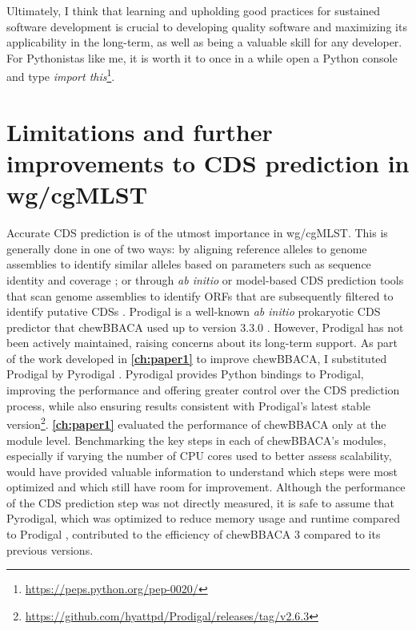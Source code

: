 Ultimately, I think that learning and upholding good practices for sustained software development is crucial to developing quality software and maximizing its applicability in the long-term, as well as being a valuable skill for any developer. For Pythonistas like me, it is worth it to once in a while open a Python console and type \textit{import this}\footnote{\url{https://peps.python.org/pep-0020/}}.

\section{Limitations and further improvements to CDS prediction in wg/cgMLST}

Accurate \ac{CDS} prediction is of the utmost importance in \ac{wg/cgMLST}. This is generally done in one of two ways: by aligning reference alleles to genome assemblies to identify similar alleles based on parameters such as sequence identity and coverage \cite{jolley_open-access_2018}; or through \textit{ab initio} or model-based \ac{CDS} prediction tools that scan genome assemblies to identify \acp{ORF} that are subsequently filtered to identify putative \acp{CDS} \cite{dimonaco_no_2022}. Prodigal is a well-known \textit{ab initio} prokaryotic \ac{CDS} predictor that chewBBACA used up to version 3.3.0 \cite{hyatt_prodigal_2010, silva_chewbbaca_2018}. However, Prodigal has not been actively maintained, raising concerns about its long-term support. As part of the work developed in \textbf{\autoref{ch:paper1}} to improve chewBBACA, I substituted Prodigal by Pyrodigal \cite{larralde_pyrodigal_2022}. Pyrodigal provides Python bindings to Prodigal, improving the performance and offering greater control over the \ac{CDS} prediction process, while also ensuring results consistent with Prodigal's latest stable version\footnote{\url{https://github.com/hyattpd/Prodigal/releases/tag/v2.6.3}}. \textbf{\autoref{ch:paper1}} evaluated the performance of chewBBACA only at the module level. Benchmarking the key steps in each of chewBBACA's modules, especially if varying the number of \ac{CPU} cores used to better assess scalability, would have provided valuable information to understand which steps were most optimized and which still have room for improvement. Although the performance of the \ac{CDS} prediction step was not directly measured, it is safe to assume that Pyrodigal, which was optimized to reduce memory usage and runtime compared to Prodigal \cite{larralde_pyrodigal_2022}, contributed to the efficiency of chewBBACA 3 compared to its previous versions.

